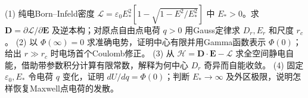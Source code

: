 (1) 纯电Born–Infeld密度 \(\mathcal L=\varepsilon_0 E_*^2[1-\sqrt{1-E^2/E_*^2}]\) 中 \(E_*>0\)。求 \(\mathbf D=\partial\mathcal L/\partial\mathbf E\) 及逆本构；对原点自由点电荷 \(q>0\) 用Gauss定律求 \(D_r,E_r\) 和尺度 \(r_c\)。
(2) 以 \(\Phi(\infty)=0\) 求准确电势，证明中心有限并用Gamma函数表示 \(\Phi(0)\)；给出 \(r\gg r_c\) 时电场首个Coulomb修正。
(3) 从 \(\mathcal H=\mathbf D\cdot\mathbf E-\mathcal L\) 求全空间静电自能，借助带参数积分计算有限常数，解释为何中心 \(D_r\) 奇异而自能收敛。
(4) 固定 \(\varepsilon_0,E_*\) 令电荷 \(q\) 变化，证明 \(dU/dq=\Phi(0)\)；判断 \(E_*\to\infty\) 及外区极限，说明怎样恢复Maxwell点电荷的发散。
